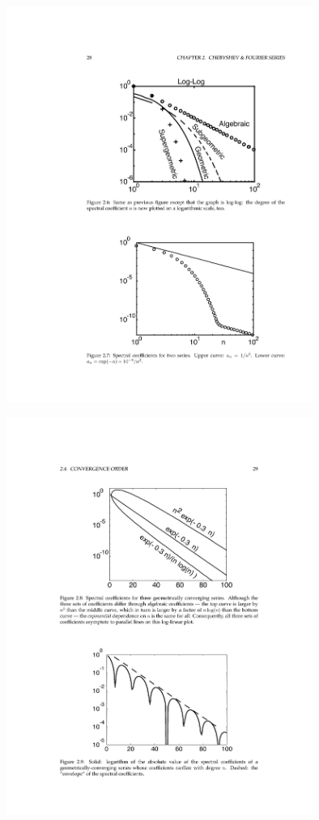 \documentclass[10pt]{beamer}
\begin{document}
\begin{frame}
\includegraphics[width=10cm]{./figs/conv2}
\end{frame}
\begin{frame}
\includegraphics[width=10cm]{./figs/conv3}
\end{frame}
\end{document}
